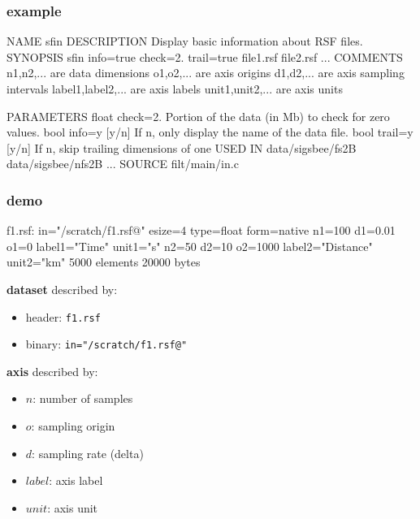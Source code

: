 \begin{frame}[fragile] \frametitle{example}


\tiny
\begin{semiverbatim}
NAME
        sfin
DESCRIPTION
        Display basic information about RSF files.
SYNOPSIS
        sfin info=true check=2. trail=true file1.rsf file2.rsf ...
COMMENTS
        n1,n2,... are data dimensions
        o1,o2,... are axis origins
        d1,d2,... are axis sampling intervals
        label1,label2,... are axis labels
        unit1,unit2,... are axis units

PARAMETERS
        float   check=2.        Portion of the data (in Mb) to check for zero values.
        bool    info=y [y/n]    If n, only display the name of the data file.
        bool    trail=y [y/n]   If n, skip trailing dimensions of  one
USED IN
        data/sigsbee/fs2B
        data/sigsbee/nfs2B
	...
SOURCE
        filt/main/in.c
\end{semiverbatim}
\end{frame}
\cwpnote{}

\begin{frame}[fragile] \frametitle{demo}


\tiny
\begin{semiverbatim}
f1.rsf:
    in="/scratch/f1.rsf@"
    esize=4 type=float form=native
    n1=100         d1=0.01        o1=0          label1="Time" unit1="s"
    n2=50          d2=10          o2=1000       label2="Distance" unit2="km"
        5000 elements 20000 bytes
\end{semiverbatim}
\end{frame}
\cwpnote{}

\begin{frame}

  \textbf{dataset} described by:
  \begin{itemize}
  \item header: \texttt{f1.rsf}
  \item binary: \texttt{in="/scratch/f1.rsf@"}
  \end{itemize}
  
  \vfill
  
  \textbf{axis} described by:
  \begin{itemize}
  \item $n$: number of samples
  \item $o$: sampling origin
  \item $d$: sampling rate (delta)
  \item $label$: axis label
  \item $unit$: axis unit
  \end{itemize}
  
\end{frame}
\cwpnote{}

